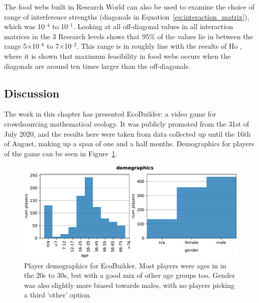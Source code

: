 The food webs built in Research World can also be used to examine the choice of range of interference strengths (diagonals in Equation~\eqref{eq:interaction_matrix}), which was 10$^{\text{--}4}$ to 10$^{\text{--}1}$. Looking at all off-diagonal values in all interaction matrices in the 3 Research levels shows that 95\% of the values lie in between the range 5$\times$10$^{\text{--}6}$ to 7$\times$10$^{\text{--}2}$. 
This range is in roughly line with the results of Ho \cite{Ho2020}, where it is shown that maximum feasibility in food webs occurs when the diagonals are around ten times larger than the off-diagonals.

\subsection{Discussion}
\label{sec:eco_discussion}

The work in this chapter has presented EcoBuilder: a video game for crowdsourcing mathematical ecology. It was publicly promoted from the 31st of July 2020, and the results here were taken from data collected up until the 16th of August, making up a span of one and a half months. Demographics for players of the game can be seen in Figure~\ref{fig:demo}.

\begin{figure}
  \centering
  \includegraphics[width=\textwidth, right]{joy/demo.pdf}
  \caption[Player demographics]{Player demographics for EcoBuilder. Most players were ages in in the 20s to 30s, but with a good mix of other age groups too. Gender was also slightly more biased towards males, with no players picking a third `other' option.}
  \label{fig:demo}
\end{figure}

